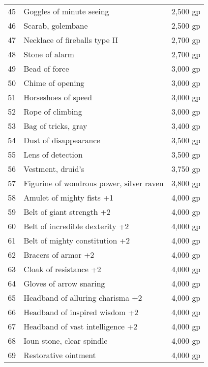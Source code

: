 \begin{xtabular}{lll}
45  & Goggles of minute seeing                    & 2,500 gp     \\
46  & Scarab, golembane                           & 2,500 gp     \\
47  & Necklace of fireballs type II               & 2,700 gp     \\
48  & Stone of alarm                              & 2,700 gp     \\
49  & Bead of force                               & 3,000 gp     \\
50  & Chime of opening                            & 3,000 gp     \\
51  & Horseshoes of speed                         & 3,000 gp     \\
52  & Rope of climbing                            & 3,000 gp     \\
53  & Bag of tricks, gray                         & 3,400 gp     \\
54  & Dust of disappearance                       & 3,500 gp     \\
55  & Lens of detection                           & 3,500 gp     \\
56  & Vestment, druid's                           & 3,750 gp     \\
57  & Figurine of wondrous power, silver raven    & 3,800 gp     \\
58  & Amulet of mighty fists +1                   & 4,000 gp     \\
59  & Belt of giant strength +2                   & 4,000 gp     \\
60  & Belt of incredible dexterity +2             & 4,000 gp     \\
61  & Belt of mighty constitution +2              & 4,000 gp     \\
62  & Bracers of armor +2                         & 4,000 gp     \\
63  & Cloak of resistance +2                      & 4,000 gp     \\
64  & Gloves of arrow snaring                     & 4,000 gp     \\
65  & Headband of alluring charisma +2            & 4,000 gp     \\
66  & Headband of inspired wisdom +2              & 4,000 gp     \\
67  & Headband of vast intelligence +2            & 4,000 gp     \\
68  & Ioun stone, clear spindle                   & 4,000 gp     \\
69  & Restorative ointment                        & 4,000 gp     \\

\end{xtabular}
